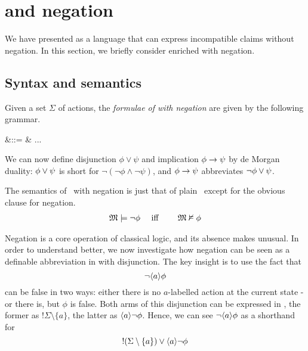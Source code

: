 \section{\Cathoristic{} and negation}\label{ELAndNegation}

\NI We have presented \cathoristic{} as a language that can express
incompatible claims without negation.  In this section, we briefly
consider \cathoristic{} enriched with negation.

\subsection{Syntax and semantics}

\begin{definition}
Given a set $\Sigma$ of actions, the \emph{formulae of \cathoristic{}
  with negation} are given by the following grammar.
\begin{GRAMMAR}
  \phi 
     &\quad ::= \quad & 
   ... \fOr \neg \phi
\end{GRAMMAR}

\NI We can now define disjunction $\phi \lor \psi$ and implication
$\phi \rightarrow \psi$ by de Morgan duality: $\phi \lor \psi$ is short
for $\neg (\neg \phi \land \neg \psi )$, and $\phi \rightarrow \psi$  abbreviates
$\neg\phi \lor \psi$.
\end{definition}

The semantics of \cathoristic\ with negation is just that of plain
\cathoristic\, except for the obvious clause for negation.
\begin{eqnarray*}
\frak{M} \models \neg \phi &\quad\mbox{ iff }\quad& \frak{M} \nvDash \phi  
\end{eqnarray*}

\NI Negation is a core operation of classical logic, and its absence makes
\cathoristic{} unusual. In order to understand \cathoristic{} better, we
now investigate how negation can be seen as a definable abbreviation
in \cathoristic{} with disjunction. The key insight is to use the fact that
\[
   \neg \langle a \rangle \phi
\]
can be false in two ways: either there is no $a$-labelled action at
the current state - or there is, but $\phi$ is false. Both arms of
this disjunction can be expressed in \cathoristic{}, the former as
$!\Sigma \setminus \{a\}$, the latter as $\langle a \rangle \neg \phi$.
 Hence, we can see $\neg \langle a \rangle \phi$ as a shorthand for 
\[
   !(\Sigma \setminus \{a\}) \lor \langle a \rangle \neg \phi
\]

